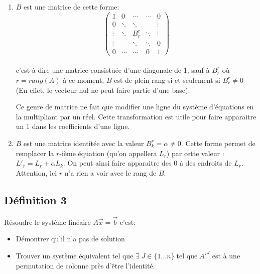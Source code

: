 \documentclass[a4paper, 11pt]{article}
\begin{document}
\begin{enumerate}
  \item $B$ est une matrice de cette forme:
    \[
      \begin{pmatrix}
        1      & 0      & \cdots    & \cdots & 0      \\
        0      & \ddots & \ddots    &        & \vdots \\
        \vdots & \ddots & B_{r}^{r} & \ddots & \vdots \\
        \vdots &        & \ddots    & \ddots & 0      \\
        0      & \cdots & \cdots    & 0      & 1 
      \end{pmatrix}
    \] \\
    c'est à dire une matrice consistuée d'une diagonale de 1, sauf à $B_{r}^{r}$ où $r = rang(A)$
    à ce moment, $B$ est de plein rang si et seulement si $B_{r}^{r} \ne 0$ (En effet, le vecteur nul ne peut faire partie d'une base).

    Ce genre de matrice ne fait que modifier une ligne du système d'équations en la multipliant par un réel.
    Cette transformation est utile pour faire apparaitre un 1 dans les coefficients d'une ligne.

  \item $B$ est une matrice identitée avec la valeur $B_{k}^{r} = \alpha \ne 0$. Cette forme permet de remplacer la $r$-ième équation
    (qu'on appellera $L_{r}$) par cette valeur : $L'_{r} = L_{r} + \alpha L_{k}$. On peut ainsi faire apparaitre des 0 à des endroits de
    $L_{r}$. \\
    Attention, ici $r$ n'a rien a voir avec le rang de $B$.
\end{enumerate}

\subsection{Définition 3}

Résoudre le système linéaire $A\vec{x} = \vec{b}$ c'est:
\begin{itemize}
  \item Démontrer qu'il n'a pas de solution
  \item Trouver un système équivalent tel que $\exists \; J \in \{ 1 ... n \} \;$tel que$\; A'^{J}$ est à une permutation de colonne près d'être l'identité.
\end{itemize}
\end{document}
